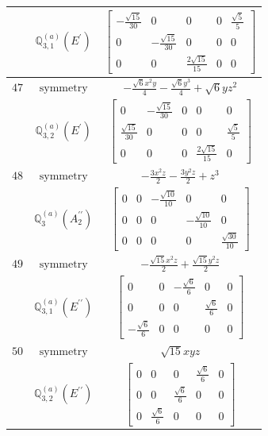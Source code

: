 \documentclass[fleqn,8pt,landscape]{jsarticle}
\begin{document}
\begin{longtable}{ccc}
$  $ & $ \mathbb{Q}_{3,1}^{(a)}(E^{\prime}) $ & $ \begin{bmatrix} - \frac{\sqrt{15}}{30} & 0 & 0 & 0 & \frac{\sqrt{5}}{5} \\ 0 & - \frac{\sqrt{15}}{30} & 0 & 0 & 0 \\ 0 & 0 & \frac{2 \sqrt{15}}{15} & 0 & 0 \end{bmatrix} $ \\ \hline
$ 47 $ & $ \text{symmetry} $ & $ - \frac{\sqrt{6} x^{2} y}{4} - \frac{\sqrt{6} y^{3}}{4} + \sqrt{6} y z^{2} $ \\
$  $ & $ \mathbb{Q}_{3,2}^{(a)}(E^{\prime}) $ & $ \begin{bmatrix} 0 & - \frac{\sqrt{15}}{30} & 0 & 0 & 0 \\ \frac{\sqrt{15}}{30} & 0 & 0 & 0 & \frac{\sqrt{5}}{5} \\ 0 & 0 & 0 & \frac{2 \sqrt{15}}{15} & 0 \end{bmatrix} $ \\ \hline
$ 48 $ & $ \text{symmetry} $ & $ - \frac{3 x^{2} z}{2} - \frac{3 y^{2} z}{2} + z^{3} $ \\
$  $ & $ \mathbb{Q}_{3}^{(a)}(A_{2}^{\prime\prime}) $ & $ \begin{bmatrix} 0 & 0 & - \frac{\sqrt{10}}{10} & 0 & 0 \\ 0 & 0 & 0 & - \frac{\sqrt{10}}{10} & 0 \\ 0 & 0 & 0 & 0 & \frac{\sqrt{30}}{10} \end{bmatrix} $ \\ \hline
$ 49 $ & $ \text{symmetry} $ & $ - \frac{\sqrt{15} x^{2} z}{2} + \frac{\sqrt{15} y^{2} z}{2} $ \\
$  $ & $ \mathbb{Q}_{3,1}^{(a)}(E^{\prime\prime}) $ & $ \begin{bmatrix} 0 & 0 & - \frac{\sqrt{6}}{6} & 0 & 0 \\ 0 & 0 & 0 & \frac{\sqrt{6}}{6} & 0 \\ - \frac{\sqrt{6}}{6} & 0 & 0 & 0 & 0 \end{bmatrix} $ \\ \hline
$ 50 $ & $ \text{symmetry} $ & $ \sqrt{15} x y z $ \\
$  $ & $ \mathbb{Q}_{3,2}^{(a)}(E^{\prime\prime}) $ & $ \begin{bmatrix} 0 & 0 & 0 & \frac{\sqrt{6}}{6} & 0 \\ 0 & 0 & \frac{\sqrt{6}}{6} & 0 & 0 \\ 0 & \frac{\sqrt{6}}{6} & 0 & 0 & 0 \end{bmatrix} $ \\ \hline

\end{longtable}
\end{document}
